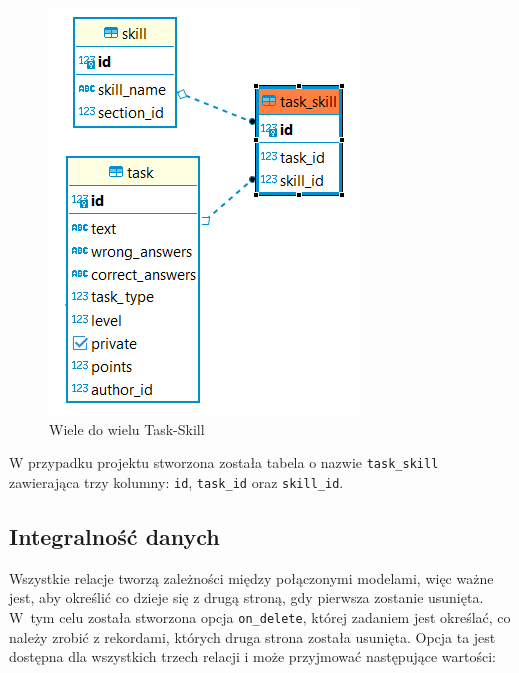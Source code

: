 \documentclass[oneside,polski,logo,indent]{amuthesis}
\begin{document}
\begin{figure}[H]
  \centering
  \includegraphics[scale=0.8]{task_skill.png}
  \caption{Wiele do wielu Task-Skill}
  \label{obraz-przyklad}
\end{figure}

W przypadku projektu stworzona została tabela o nazwie \texttt{task\_skill} zawierająca trzy kolumny: \texttt{id}, \texttt{task\_id} oraz \texttt{skill\_id}.

\begin{center}
\subsection{Integralność danych}
\end{center}
Wszystkie relacje tworzą zależności między połączonymi modelami, więc ważne jest, aby określić co dzieje się z drugą stroną, gdy pierwsza zostanie usunięta.
W~tym celu została stworzona opcja \texttt{on\_delete}, której zadaniem jest określać, co należy zrobić z rekordami, których druga strona została usunięta. Opcja ta jest dostępna dla wszystkich trzech relacji i może przyjmować następujące wartości:
\end{document}
